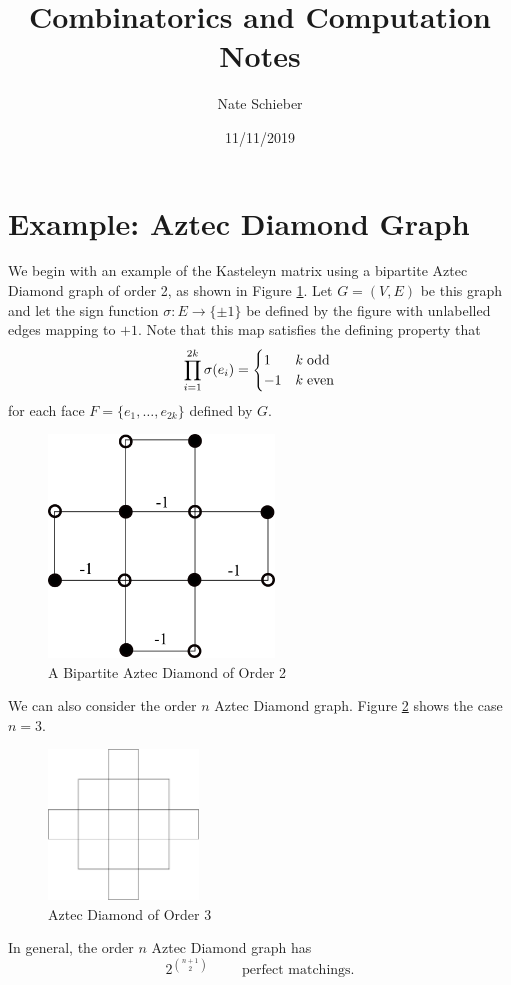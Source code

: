 \documentclass{article}
\begin{document}
	
	\title{Combinatorics and Computation Notes}
	\author{Nate Schieber}
	\date{11/11/2019}
	\maketitle
	
	\section{Example: Aztec Diamond Graph}
	
\hspace{1cm} We begin with an example of the Kasteleyn matrix using a bipartite Aztec Diamond graph of order 2, as shown in Figure \ref{fig:ad2}. Let $G = (V,E)$ be this graph and let the sign function $\sigma: E \rightarrow \{\pm 1\}$ be defined by the figure with unlabelled edges mapping to $+1$. Note that this map satisfies the defining property that
$$
\prod_{i=1}^{2k} \sigma(e_i) = 
	\begin{cases}
		1 & k \hspace{1mm} \text{odd} \\
		-1 & k \hspace{1mm} \text{even} 
	\end{cases}
$$
for each face $F = \{e_1, \dots, e_{2k}\}$ defined by $G$. 
\begin{figure}[h]
	\begin{center}
 	\includegraphics[width=6cm]{figures/aztec_diamond_2.png}
  	\caption{A Bipartite Aztec Diamond of Order 2}
	 \label{fig:ad2}
 	 \end{center}
\end{figure}

We can also consider the order $n$ Aztec Diamond graph. Figure \ref{fig:ad3} shows the case $n = 3$. 
\begin{figure}[h]
	\begin{center}
 	\includegraphics[width=4cm]{figures/aztec_diamond_3.png}
  	\caption{Aztec Diamond of Order 3}
	 \label{fig:ad3}
 	 \end{center}
\end{figure}
In general, the order $n$ Aztec Diamond graph has 
$$
2^{{n+1}\choose{2}} \hspace{1cm} \text{perfect matchings.}
$$
\end{document}
